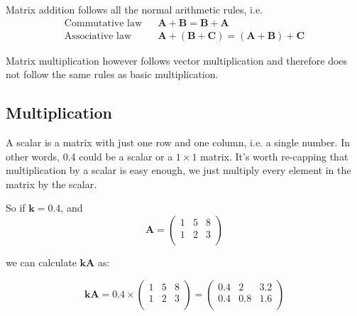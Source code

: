 Matrix addition follows all the normal arithmetic rules, i.e.
\begin{eqnarray*}
\mbox{Commutative law} && \mathbf{A} + \mathbf{B} = \mathbf{B} + \mathbf{A}\\
\mbox{Associative law} && \mathbf{A} + (\mathbf{B} + \mathbf{C}) = (\mathbf{A} + \mathbf{B}) + \mathbf{C}
\end{eqnarray*}

Matrix multiplication however follows vector multiplication and therefore does not follow the same rules as basic multiplication.

\subsection{Multiplication}

 
A scalar is a matrix with just one row and one column, i.e. a single number.   In other words, 0.4 could be a scalar or a $1\times1$ matrix.   It's worth re-capping that multiplication by a scalar is easy enough, we just multiply every element in the matrix by the scalar.

So if $\mathbf{k} = 0.4$, and 
\begin{displaymath}
\mathbf{A} = 
\left( \begin{array}{rrr}
1 & 5 & 8\\
1 & 2 &  3\\
\end{array}
\right)
\end{displaymath}

we can calculate $\mathbf{kA}$ as:

\begin{displaymath}
\mathbf{kA} = 0.4 \times
\left( \begin{array}{rrr}
1 & 5 & 8\\
1 & 2 &  3\\
\end{array}
\right)
=
\left( \begin{array}{rrr}
0.4 & 2 & 3.2\\
0.4 & 0.8 &  1.6\\
\end{array}
\right)
\end{displaymath}

